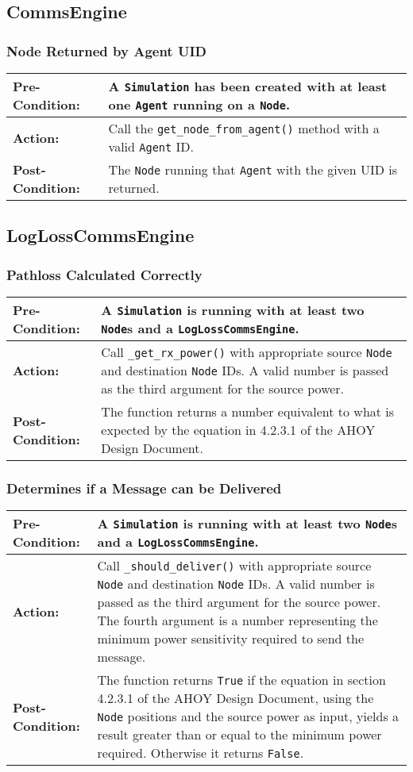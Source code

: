 \documentclass[titlepage]{article}
\newcommand{\testcase}[3]{
    \begin{center}
    \begin{tabular}{| l | p{0.7\textwidth}|}
        \hline
        \rowcolor[gray]{0.8}\textbf{Pre-Condition:} & #1 \\ \hline
        \textbf{Action:} & #2 \\ \hline
        \rowcolor[gray]{0.8}\textbf{Post-Condition:} & #3 \\ \hline
    \end{tabular}
    \end{center}
}
\begin{document}
\subsection{CommsEngine}
\subsubsection{Node Returned by Agent UID}
\testcase{A \texttt{Simulation} has been created with at least one \texttt{Agent} running on a \texttt{Node}. }{Call the \texttt{get\_node\_from\_agent()} method with a valid \texttt{Agent} ID.}{The \texttt{Node} running that \texttt{Agent} with the given UID is returned.}


\subsection{LogLossCommsEngine}
\subsubsection{Pathloss Calculated Correctly}
\testcase{A \texttt{Simulation} is running with at least two \texttt{Node}s and a \texttt{LogLossCommsEngine}. }{Call \texttt{\_get\_rx\_power()} with appropriate source \texttt{Node} and destination \texttt{Node} IDs. A valid number is passed as the third argument for the source power.}{The function returns a number equivalent to what is expected by the equation in 4.2.3.1 of the AHOY Design Document.}

\subsubsection{Determines if a Message can be Delivered}
\testcase{A \texttt{Simulation} is running with at least two \texttt{Node}s and a \texttt{LogLossCommsEngine}.}{Call \texttt{\_should\_deliver()} with appropriate source \texttt{Node} and destination \texttt{Node} IDs. A valid number is passed as the third argument for the source power. The fourth argument is a number representing the minimum power sensitivity required to send the message.}{The function returns \texttt{True} if the equation in section 4.2.3.1 of the AHOY Design Document, using the \texttt{Node} positions and the source power as input, yields a result greater than or equal to the minimum power required. Otherwise it returns \texttt{False}.}
\end{document}

